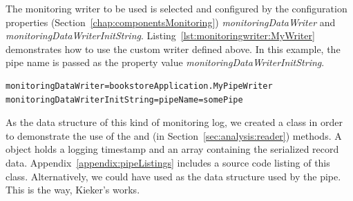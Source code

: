 \setJavaCodeListing


\noindent The monitoring writer to be used is selected and configured by the \KiekerMonitoringPart{} %
configuration properties (Section~\ref{chap:componentsMonitoring}) %
\textit{monitoringDataWriter} and \textit{monitoringDataWriterInitString}. %
Listing~\ref{lst:monitoringwriter:MyWriter} demonstrates how to use the custom %
writer  defined above. In this example, the pipe name is %
passed as the property value \textit{monitoringDataWriterInitString}.

\setBashListing       
\begin{lstlisting}[label=lst:monitoringwriter:MyWriter]
monitoringDataWriter=bookstoreApplication.MyPipeWriter
monitoringDataWriterInitString=pipeName=somePipe
\end{lstlisting}

\enlargethispage{1cm}

\noindent As the data structure of this kind of monitoring log, we created a %
class  in order to demonstrate the use of the  and %
 (in Section~\ref{sec:analysis:reader}) methods. %
A  object holds a logging timestamp and an  array %
containing the serialized record data. %
Appendix~\ref{appendix:pipeListings} includes a source code listing of this class. %
Alternatively, we could have used  as the data structure %
used by the pipe. This is the way, Kieker's  works. %